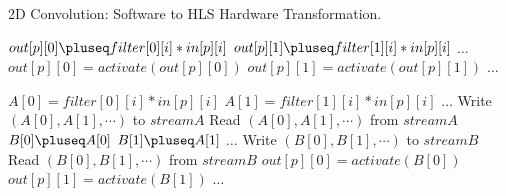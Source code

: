 \begin{algorithm}[H]
    \caption[Conv2d Software to HLS Transformation.]{2D Convolution: Software to HLS Hardware Transformation.}
    \label{alg:Conv2d_SW_to_HLS}
    \begin{algorithmic}
                    \State $out[p][0] \pluseq filter[0][i] * in[p][i]$
                    \State $out[p][1] \pluseq filter[1][i] * in[p][i]$
                    \State $\ldots$ 
                \EndFor
                \State $out[p][0] = activate(out[p][0])$
                \State $out[p][1] = activate(out[p][1])$
                \State $\ldots$ 
            \EndFor
        \EndFunction
        
        \EndFunction
                    \State $A[0] = filter[0][i] * in[p][i]$
                    \State $A[1] = filter[1][i] * in[p][i]$
                \State $\ldots$ 
                    \State Write $(A[0], A[1], \cdots)$ to $streamA$
                \EndFor
            \EndFor
        \EndFunction
                    \State Read $(A[0], A[1], \cdots)$ from $streamA$\
                    \State $B[0] \pluseq A[0]$
                    \State $B[1] \pluseq A[1]$
                    \State $\ldots$ 
                \EndFor
                \State Write $(B[0], B[1], \cdots)$ to $streamB$
            \EndFor
        \EndFunction
                \State Read $(B[0], B[1], \cdots)$ from $streamB$
                \State $out[p][0] = activate(B[0])$
                \State $out[p][1] = activate(B[1])$
                \State $\ldots$ 
            \EndFor
        \EndFunction
    \end{algorithmic}
\end{algorithm}

